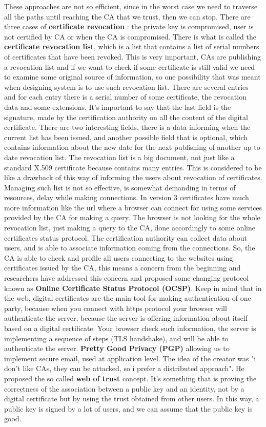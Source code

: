 \documentclass[11pt]{article}
\begin{document}
These approaches are not so efficient, since in the worst case we need to traverse all the paths until reaching the CA that we trust, then we can stop. There are three cases of \textbf{certificate revocation} : the private key is compromised, user is not certified by CA or when the CA is compromised. There is what is called the \textbf{certificate revocation list}, which is a list that contains a list of serial numbers of certificates that have been revoked. This is very important, CAs are publishing a revocation list and if we want to check if some certificate is still valid we need to examine some original source of information, so one possibility that was meant when designing system is to use such revocation list. There are several entries and for each entry there is a serial number of some certificate, the revocation data and some extensions. It's important to say that the last field is the signature, made by the certification authority on all the content of the digital certificate. There are two interesting fields, there is a data informing when the current list has been issued, and another possible field that is optional, which contains information about the new date for the next publishing of another up to date revocation list. The revocation list is a big document, not just like a standard X.509 certificate because contains many entries. This is considered to be like a drawback of this way of informing the users about revocation of certificates. Managing such list is not so effective, is somewhat demanding in terms of resources, delay while making connections. In version $3$ certificates have much more information like the url where a browser can connect for using some services provided by the CA for making a query. The browser is not looking for the whole revocation list, just making a query to the CA, done accordingly to some online certificates status protocol. The certification authority can collect data about users, and is able to associate information coming from the connections. So, the CA is able to check and profile all users connecting to the websites using certificates issued by the CA, this means a concern from the beginning and researchers have addressed this concern and proposed some changing protocol known as \textbf{Online Certificate Status Protocol (OCSP)}. Keep in mind that in the web, digital certificates are the main tool for making authentication of one party, because when you connect with https protocol your browser will authenticate the server, because the server is offering information about itself based on a digital certificate. Your browser check such information, the server is implementing a sequence of steps (TLS handshake), and will be able to authenticate the server. \textbf{Pretty Good Privacy (PGP)} allowing us to implement secure email, used at application level. The idea of the creator was "i don't like CAs, they can be attacked, so i prefer a distributed approach". He proposed the so called \textbf{web of trust} concept. It's something that is proving the correctness of the association between a public key and an identity, not by a digital certificate but by using the trust obtained from other users. In this way, a public key is signed by a lot of users, and we can assume that the public key is good.
\end{document}
